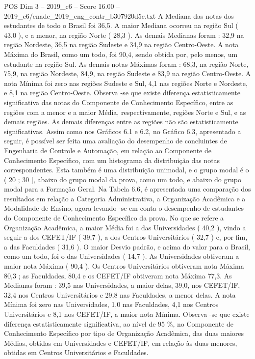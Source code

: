 \begin{textsample}{POS Dim 3 – 2019\_c6 – Score 16.00 – 2019\_c6/enade\_2019\_eng\_contr\_b307920d5e.txt}
A Mediana das notas dos estudantes de todo o Brasil foi 36,5.
A maior Mediana ocorreu na região Sul ( 43,0 ), e a menor, na região Norte ( 28,3 ).
As demais Medianas foram : 32,9 na região Nordeste, 36,5 na região Sudeste e 34,9 na região Centro-Oeste.
A nota Máxima do Brasil, como um todo, foi 90,4, sendo obtida por, pelo menos, um estudante na região Sul.
As demais notas Máximas foram : 68,3, na região Norte, 75,9, na região Nordeste, 84,9, na região Sudeste e 83,9 na região Centro-Oeste.
A nota Mínima foi zero nas regiões Sudeste e Sul, 4,1 nas regiões Norte e Nordeste, e 8,1 na região Centro-Oeste.
Observa -se que existe diferença estatisticamente significativa das notas do Componente de Conhecimento Específico, entre as regiões com a menor e a maior Média, respectivamente, regiões Norte e Sul, e as demais regiões.
As demais diferenças entre as regiões não são estatisticamente significativas.
Assim como nos Gráficos 6.1 e 6.2, no Gráfico 6.3, apresentado a seguir, é possível ser feita uma avaliação do desempenho de concluintes de Engenharia de Controle e Automação, em relação ao Componente de Conhecimento Específico, com um histograma da distribuição das notas correspondentes.
Esta também é uma distribuição unimodal, e o grupo modal é o ( 20 ; 30 ], abaixo do grupo modal da prova, como um todo, e abaixo do grupo modal para a Formação Geral.
Na Tabela 6.6, é apresentada uma comparação dos resultados em relação a Categoria Administrativa, a Organização Acadêmica e a Modalidade de Ensino, agora levando -se em conta o desempenho de estudantes do Componente de Conhecimento Específico da prova.
No que se refere a Organização Acadêmica, a maior Média foi a das Universidades ( 40,2 ), vindo a seguir a dos CEFET/IF ( 39,7 ), a dos Centros Universitários ( 32,7 ) e, por fim, a das Faculdades ( 31,6 ).
O maior Desvio padrão, e acima do valor para o Brasil, como um todo, foi o das Universidades ( 14,7 ).
As Universidades obtiveram a maior nota Máxima ( 90,4 ).
Os Centros Universitários obtiveram nota Máxima 80,3 ; as Faculdades, 80,4 e os CEFET/IF obtiveram nota Máxima 77,3.
As Medianas foram : 39,5 nas Universidades, a maior delas, 39,0, nos CEFET/IF, 32,4 nos Centros Universitários e 29,8 nas Faculdades, a menor delas.
A nota Mínima foi zero nas Universidades, 1,0 nas Faculdades, 4,1 nos Centros Universitários e 8,1 nos CEFET/IF, a maior nota Mínima.
Observa -se que existe diferença estatisticamente significativa, ao nível de 95 \%, no Componente de Conhecimento Específico por tipo de Organização Acadêmica, das duas maiores Médias, obtidas em Universidades e CEFET/IF, em relação às duas menores, obtidas em Centros Universitários e Faculdades.

\end{textsample}
